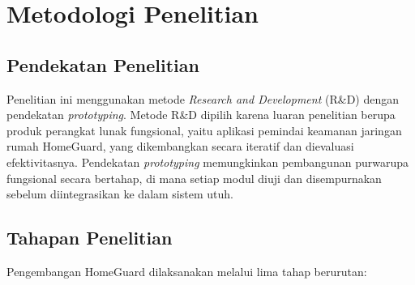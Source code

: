 %
%

\section{Metodologi Penelitian}

\subsection{Pendekatan Penelitian}
Penelitian ini menggunakan metode \textit{Research and Development}
(R\&D) dengan pendekatan \textit{prototyping}. Metode R\&D dipilih
karena luaran penelitian berupa produk perangkat lunak fungsional, yaitu
aplikasi pemindai keamanan jaringan rumah HomeGuard, yang dikembangkan
secara iteratif dan dievaluasi efektivitasnya. Pendekatan
\textit{prototyping} memungkinkan pembangunan purwarupa fungsional secara
bertahap, di mana setiap modul diuji dan disempurnakan sebelum
diintegrasikan ke dalam sistem utuh.

\subsection{Tahapan Penelitian}
Pengembangan HomeGuard dilaksanakan melalui lima tahap berurutan:

